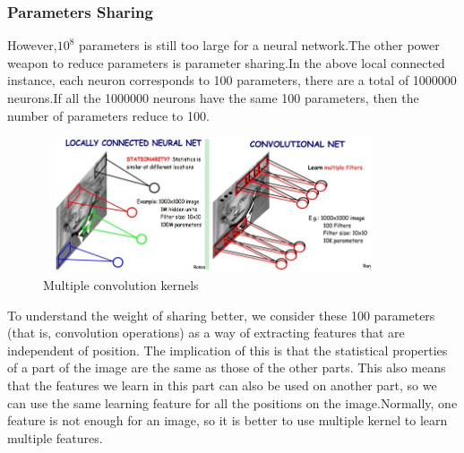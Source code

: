 \documentclass[12pt,a4paper]{report}
\begin{document}
\subsubsection{Parameters Sharing}
However,$10^8$ parameters is still too large for a neural network.The other power weapon to reduce parameters is parameter sharing.In the above local connected instance, each neuron corresponds to 100 parameters, there are a total of 1000000 neurons.If  all the 1000000 neurons have the same 100 parameters, then the number of parameters reduce to 100.\\
\begin{figure}[h]
\centering
\includegraphics[height=4cm,width=0.9\textwidth]{parameter.png}
\caption{Multiple convolution kernels}
\end{figure}
To understand the weight of sharing better, we consider these 100 parameters (that is, convolution operations) as a way of extracting features that are independent of position. The implication of this is that the statistical properties of a part of the image are the same as those of the other parts. This also means that the features we learn in this part can also be used on another part, so we can use the same learning feature for all the positions on the image.Normally, one feature is not enough for an image, so it is better to use multiple kernel to learn multiple features.
\end{document}
